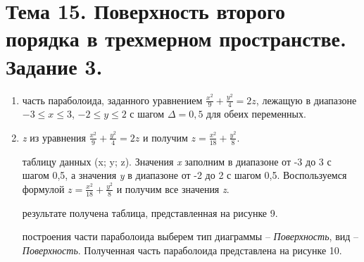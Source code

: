 \section{Тема 15. Поверхность второго порядка в трехмерном пространстве. Задание 3.}
\label{sec:task15}

\begin{enumerate}
	\item{} часть параболоида, заданного уравнением $\frac{x^2}{9} + \frac{y^2}{4} = 2z$, лежащую в диапазоне $-3 \leq x \leq 3$, $-2 \leq y \leq 2$ с шагом $\Delta = 0,5$ для обеих переменных.
	\item{} \textit{z} из уравнения $\frac{x^2}{9} + \frac{y^2}{4} = 2z$ и получим $z =\frac{x^2}{18} + \frac{y^2}{8}$.
	\begin{item}
		 таблицу данных (x; y; z). Значения \textit{x} заполним в диапазоне от -3 до 3 с шагом 0,5, а значения \textit{y} в диапазоне от -2 до 2 с шагом 0,5. Воспользуемся формулой $z =\frac{x^2}{18} + \frac{y^2}{8}$ и получим все значения \textit{z}.

		 результате получена таблица, представленная на рисунке 9.

        \newpage

		 построения части параболоида выберем тип диаграммы -- \textit{Поверхность}, вид -- \textit{Поверхность}. Полученная часть параболоида представлена на рисунке 10.

	\end{item}
\end{enumerate}
